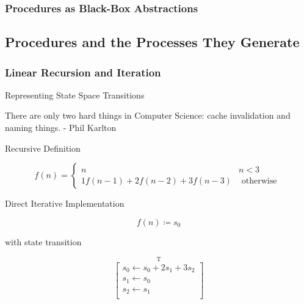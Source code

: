             \subsubsection{Procedures as Black-Box Abstractions}
        \subsection{Procedures and the Processes They Generate}
            \subsubsection{Linear Recursion and Iteration}

Representing State Space Transitions
\newline

\begin{displayquote}
There are only two hard things in Computer Science: cache invalidation and naming things.
\newline
- Phil Karlton
\end{displayquote}

Recursive Definition
\newline

\begin{equation}
f\left(n\right) = 
\begin{cases}
n & n < 3 \\
1 f\left(n-1\right) + 2 f\left(n-2\right) + 3 f\left(n-3\right) & \mbox{ otherwise }
\end{cases}
\label{eq:ss_recursive}
\end{equation}

Direct Iterative Implementation
\newline

\begin{equation}
f\left(n\right) \coloneqq s_0
\label{eq:direct_def}
\end{equation}

with state transition

\begin{equation}
\stackrel{\mbox{T}}{
\left[ \begin{array}{c}
s_0 \leftarrow s_0 + 2 s_1 + 3 s_2 \\
s_1 \leftarrow s_0 \\
s_2 \leftarrow s_1 \\
\end{array} \right]
}
\label{eq:direct_trans}
\end{equation}

